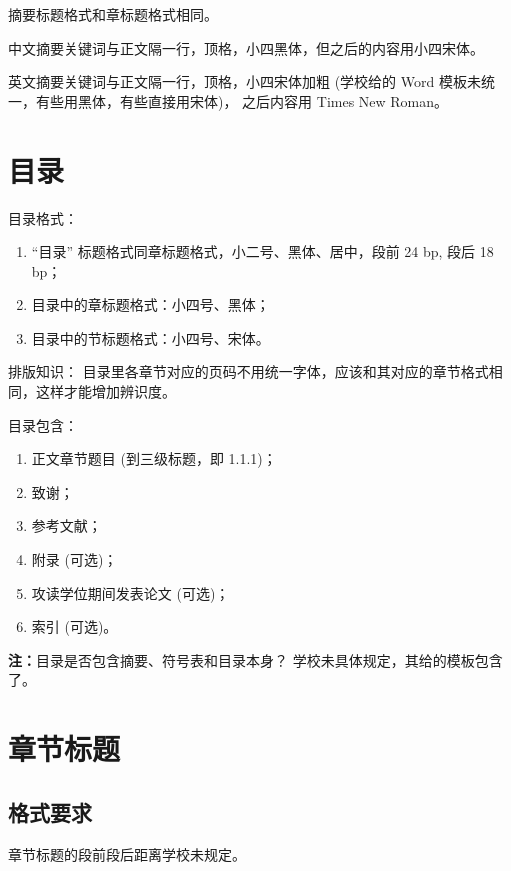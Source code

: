 摘要标题格式和章标题格式相同。

中文摘要关键词与正文隔一行，顶格，小四黑体，但之后的内容用小四宋体。

英文摘要关键词与正文隔一行，顶格，小四宋体加粗 (学校给的 Word 模板未统一，有些用黑体，有些直接用宋体)， 
之后内容用 Times New Roman。

\section{目录}

目录格式：

\begin{enumerate}
	\item ``目录'' 标题格式同章标题格式，小二号、黑体、居中，段前 24 bp, 段后 18 bp；
	\item 目录中的章标题格式：小四号、黑体；
	\item 目录中的节标题格式：小四号、宋体。
\end{enumerate}

\textsf{排版知识：} 目录里各章节对应的页码不用统一字体，应该和其对应的章节格式相同，这样才能增加辨识度。

目录包含：

\begin{enumerate}
	\item 正文章节题目 (到三级标题，即 1.1.1)；
	\item 致谢；
	\item 参考文献；
	\item 附录 (可选)；
	\item 攻读学位期间发表论文 (可选)；
	\item 索引 (可选)。
\end{enumerate}

\textbf{注：}目录是否包含摘要、符号表和目录本身？ 学校未具体规定，其给的模板包含了。

\section{章节标题}

\subsection{格式要求}

章节标题的段前段后距离学校未规定。

